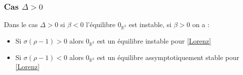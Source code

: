 \documentclass{article}
\newcommand{\R}{\mathbb{R}}
\newtheorem[M , nocut]{prop}{Proposition}[section]
\newtheorem[M , nocut]{definition}{Définition}
\newtheorem[M , nocut]{lemme}{Lemme}
\newtheorem[L , nocut]{thm}{Théoreme}
\newtheorem[M , nocut]{cor}{Corollaire}
\begin{document}
\subsubsection*{Cas $\Delta > 0$}

\begin{prop}
    \label{prop:eqDsup0}
    Dans le cas $\Delta>0$ si $\beta<0$ l'équilibre $0_{\R^3}$ est instable, si $\beta >0$ on a :
    \begin{itemize}
        \item Si $\sigma(\rho-1)>0$ alors $0_{\R^3}$ est un équilibre instable pour \eqref{Lorenz}
        \item Si $\sigma(\rho-1)<0$ alors $0_{\R^3}$ est un équilibre assymptotiquement stable pour \eqref{Lorenz}
    \end{itemize}
\end{prop}
\end{document}
